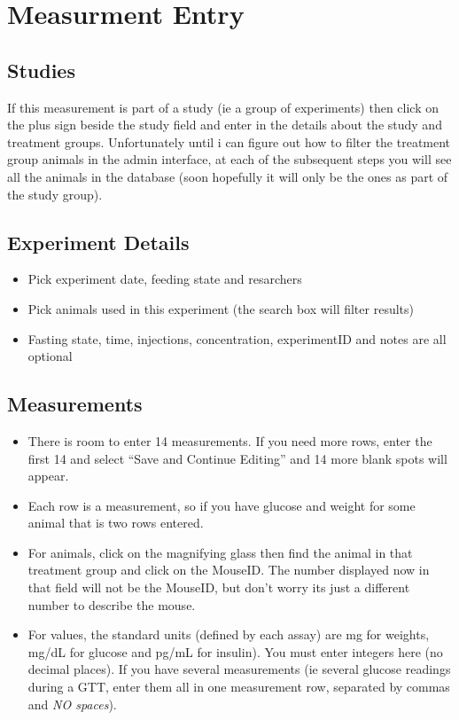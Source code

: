 \documentclass[letterpaper,10pt,english]{sphinxmanual}
\begin{document}
\chapter{Measurment Entry}


\section{Studies}

If this measurement is part of a study (ie a group of experiments) then click on the plus sign beside the study field and enter in the details about the study and treatment groups.  Unfortunately until i can figure out how to filter the treatment group animals in the admin interface, at each of the subsequent steps you will see all the animals in the database (soon hopefully it will only be the ones as part of the study group).


\section{Experiment Details}
\begin{itemize}
\item {} 
Pick experiment date, feeding state and resarchers

\item {} 
Pick animals used in this experiment (the search box will filter results)

\item {} 
Fasting state, time, injections, concentration, experimentID and notes are all optional

\end{itemize}


\section{Measurements}
\begin{itemize}
\item {} 
There is room to enter 14 measurements.  If you need more rows, enter the first 14 and select ``Save and Continue Editing'' and 14 more blank spots will appear.

\item {} 
Each row is a measurement, so if you have glucose and weight for some animal that is two rows entered.

\item {} 
For animals, click on the magnifying glass then find the animal in that treatment group and click on the MouseID. The number displayed now in that field will not be the MouseID, but don't worry its just a different number to describe the mouse.

\item {} 
For values, the standard units (defined by each assay) are mg for weights, mg/dL for glucose and pg/mL for insulin).  You must enter integers here (no decimal places).  If you have several measurements (ie several glucose readings during a GTT, enter them all in one measurement row, separated by commas and \emph{NO spaces}).

\end{itemize}
\end{document}
